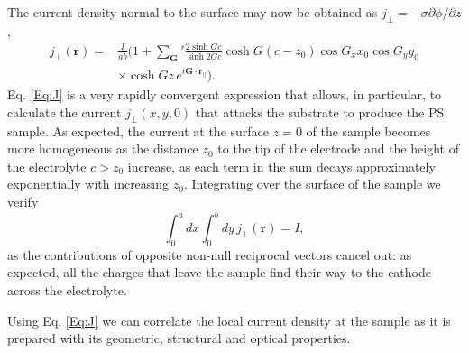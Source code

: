 \documentclass[review,sort&compress]{cas-sc}
\begin{document}
The current density normal to the surface may now be obtained as
$j_\perp=-\sigma\partial\phi/\partial z$,
\begin{equation}
  \label{Eq:J}
  \begin{split}
    j_\perp(\bm r) =& \frac{I}{ab}\biggl(1+{\sum_{\bm G}}'\frac{2\sinh
      Gc}{\sinh 2Gc}\cosh G(c-z_0)\cos G_x x_0 \cos G_y y_0\\
    &\times \cosh Gz\, e^{i\bm G\cdot\bm r_\|}\biggr).
  \end{split}
\end{equation}
Eq. \eqref{Eq:J} is a very rapidly convergent expression that allows,
in particular, to calculate the current $j_\perp(x,y,0)$ that attacks
the substrate to produce the PS sample. As expected, the current
at the surface $z=0$ of the sample becomes more homogeneous as the
distance $z_0$ to the tip of the electrode and the height of the
electrolyte $c>z_0$ increase, as each term in the sum decays
approximately exponentially with increasing $z_0$.
Integrating over the surface of the sample we verify
\begin{equation}
  \label{eq:intj}
  \int_0^adx\int_0^bdy\,j_\perp(\bm r)=I,
\end{equation}
as the contributions of opposite non-null reciprocal vectors cancel
out: as expected, all the charges that leave the sample find
their way  to the cathode across the electrolyte.

Using Eq. \eqref{Eq:J} we can correlate the local current density at
the sample as it is prepared with its geometric, structural and optical
properties.
\end{document}
